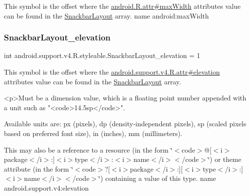 This symbol is the offset where the \hyperlink{}{android.\+R.\+attr\#max\+Width} attribute\textquotesingle{}s value can be found in the \hyperlink{classandroid_1_1support_1_1v4_1_1R_1_1styleable_adeacc34656ceb21bac2e2f80c4437fbc}{Snackbar\+Layout} array.  name android\+:max\+Width \mbox{\label{classandroid_1_1support_1_1v4_1_1R_1_1styleable_a6de1ff1662bd8a8c27b3cbf7f2e42cd1}} 
\subsubsection{\texorpdfstring{Snackbar\+Layout\+\_\+elevation}{SnackbarLayout\_elevation}}
{\footnotesize\ttfamily int android.\+support.\+v4.\+R.\+styleable.\+Snackbar\+Layout\+\_\+elevation = 1\hspace{0.3cm}{\ttfamily [static]}}

This symbol is the offset where the \hyperlink{classandroid_1_1support_1_1v4_1_1R_1_1attr_a5906f91b859c693a38a88ad3b0be4a39}{android.\+support.\+v4.\+R.\+attr\#elevation} attribute\textquotesingle{}s value can be found in the \hyperlink{classandroid_1_1support_1_1v4_1_1R_1_1styleable_adeacc34656ceb21bac2e2f80c4437fbc}{Snackbar\+Layout} array.

\begin{DoxyVerb}      <p>Must be a dimension value, which is a floating point number appended with a unit such as "<code>14.5sp</code>".
\end{DoxyVerb}
 Available units are\+: px (pixels), dp (density-\/independent pixels), sp (scaled pixels based on preferred font size), in (inches), mm (millimeters). 

This may also be a reference to a resource (in the form \char`\"{}$<$code$>$@\mbox{[}$<$i$>$package$<$/i$>$\+:\mbox{]}$<$i$>$type$<$/i$>$\+:$<$i$>$name$<$/i$>$$<$/code$>$\char`\"{}) or theme attribute (in the form \char`\"{}$<$code$>$?\mbox{[}$<$i$>$package$<$/i$>$\+:\mbox{]}\mbox{[}$<$i$>$type$<$/i$>$\+:\mbox{]}$<$i$>$name$<$/i$>$$<$/code$>$\char`\"{}) containing a value of this type.  name android.\+support.\+v4\+:elevation \mbox{\label{classandroid_1_1support_1_1v4_1_1R_1_1styleable_aeb129833e9a42db9f72110a798421a5f}} 
